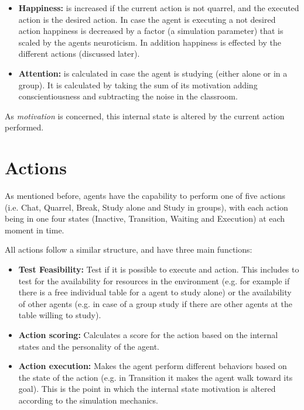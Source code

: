 \begin{itemize}
    \item \textbf{Happiness:} is increased if the current action is not quarrel,
    and the executed action is the desired action. In case the agent
    is executing a not desired action happiness is decreased by a factor (a
    simulation parameter) that is scaled by the agents neuroticism. In addition
    happiness is effected by the different actions (discussed later).
    \item \textbf{Attention:} is calculated in case the agent is studying (either
    alone or in a group). It is calculated by taking the sum of its motivation
    adding conscientiousness and subtracting the noise in the classroom.
\end{itemize}

As \textit{motivation} is concerned, this internal state is altered by the current action performed.

\section{Actions}
As mentioned before, agents have the capability to perform one of five actions (i.e.
Chat, Quarrel, Break, Study alone and Study in groups),
with each action being in one four states (Inactive, Transition, Waiting and Execution)
at each moment in time.

All actions follow a similar structure, and have three main functions:

\begin{itemize}
    \item \textbf{Test Feasibility:} Test if it is possible to execute and action. This
    includes to test for the availability for resources in the environment
    (e.g. for example if there is a free individual table for a agent to study alone)
    or the availability of other agents (e.g. in case of a group study if there are
    other agents at the table willing to study).
    \item \textbf{Action scoring:} Calculates a score for the action based on the
    internal states and the personality of the agent.
    \item \textbf{Action execution:} Makes the agent perform different behaviors
    based on the state of the action (e.g. in Transition it makes the agent walk toward its goal).
    This is the point in which the internal state motivation is altered according
    to the simulation mechanics.
\end{itemize}


